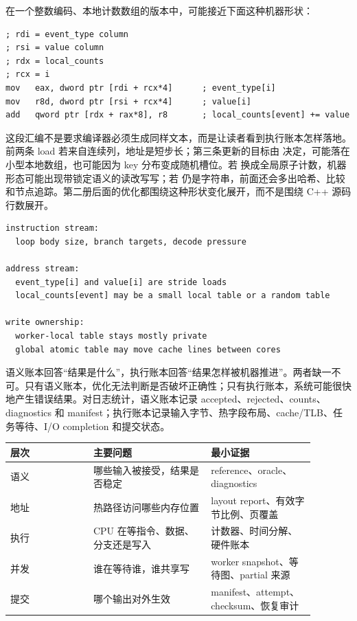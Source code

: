  在一个整数编码、本地计数数组的版本中，可能接近下面这种机器形状：

\begin{lstlisting}[numbers=none,caption={本地计数更新的一种典型汇编形状}]
; rdi = event_type column
; rsi = value column
; rdx = local_counts
; rcx = i
mov   eax, dword ptr [rdi + rcx*4]      ; event_type[i]
mov   r8d, dword ptr [rsi + rcx*4]      ; value[i]
add   qword ptr [rdx + rax*8], r8       ; local_counts[event] += value
\end{lstlisting}

这段汇编不是要求编译器必须生成同样文本，而是让读者看到执行账本怎样落地。前两条 load 若来自连续列，地址是短步长；第三条更新的目标由  决定，可能落在小型本地数组，也可能因为 key 分布变成随机槽位。若  换成全局原子计数，机器形态可能出现带锁定语义的读改写写；若  仍是字符串，前面还会多出哈希、比较和节点追踪。第二册后面的优化都围绕这种形状变化展开，而不是围绕 C++ 源码行数展开。

\begin{lstlisting}[numbers=none,caption={同一更新块的硬件读法}]
instruction stream:
  loop body size, branch targets, decode pressure

address stream:
  event_type[i] and value[i] are stride loads
  local_counts[event] may be a small local table or a random table

write ownership:
  worker-local table stays mostly private
  global atomic table may move cache lines between cores
\end{lstlisting}

语义账本回答“结果是什么”，执行账本回答“结果怎样被机器推进”。两者缺一不可。只有语义账本，优化无法判断是否破坏正确性；只有执行账本，系统可能很快地产生错误结果。对日志统计，语义账本记录 accepted、rejected、counts、diagnostics 和 manifest；执行账本记录输入字节、热字段布局、cache/TLB、任务等待、I/O completion 和提交状态。

\begin{center}
\begin{tabular}{p{0.24\linewidth}p{0.34\linewidth}p{0.30\linewidth}}
\toprule
层次 & 主要问题 & 最小证据 \\
\midrule
语义 & 哪些输入被接受，结果是否稳定 & reference、oracle、diagnostics \\
地址 & 热路径访问哪些内存位置 & layout report、有效字节比例、页覆盖 \\
执行 & CPU 在等指令、数据、分支还是写入 & 计数器、时间分解、硬件账本 \\
并发 & 谁在等待谁，谁共享写 & worker snapshot、等待图、partial 来源 \\
提交 & 哪个输出对外生效 & manifest、attempt、checksum、恢复审计 \\
\bottomrule
\end{tabular}
\end{center}

